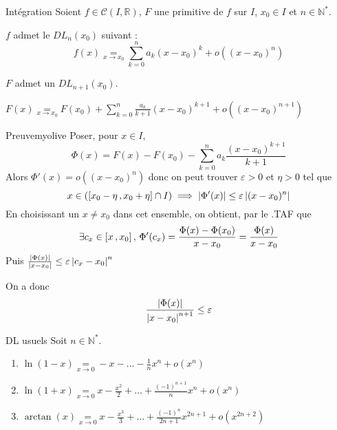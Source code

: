     \begin{prop}{Intégration}{}
        Soient $f \in \mathcal{C}(I,\mathbb{R})$, $F$ une primitive de $f$ sur $I$, $x_0 \in I$ et $n \in \mathbb{N}^*$.

        \begin{suppose}
            \item $f$ admet le $DL_n(x_0)$ suivant : \[ f(x) \underset{x \rightarrow x_0}{=} \sum\limits_{k=0}^n a_k (x - x_0)^k + o\left((x-x_0)^n\right) \]
        \end{suppose}
        \tcblower
        \begin{alors}
            \item $F$ admet un $DL_{n+1}(x_0)$.
            \item $F(x) \underset{x \rightarrow x_0}{=} F(x_0) + \sum\limits_{k=0}^n \frac{a_k}{k+1} (x - x_0)^{k+1} + o\left((x-x_0)^{n+1}\right)$
        \end{alors}
    \end{prop}

    \begin{demo}{Preuve}{myolive}
        Poser, pour $x \in I$, 
        \[ \Phi (x) = F(x)-F(x_0)-\sum\limits_{k=0}^n a_k \frac{(x-x_0)^{k+1}}{k+1} \]
        Alors $\Phi'(x) = o((x-x_0)^n)$ donc on peut trouver $\varepsilon > 0$ et $\eta > 0$ tel que \[ x \in (\left[ x_0-\eta \, , x_0+\eta \right]\cap I) \implies \left\lvert \Phi'(x)\right\rvert \leq \varepsilon \left\lvert (x-x_0)^n\right\rvert \]
        En choisissant un $x \neq x_0$ dans cet ensemble, on obtient, par le .TAF que \[ \exists c_x \in \left[ x \, , x_0 \right], \, \Phi'(c_x) = \frac{\Phi(x) - \Phi(x_0)}{x-x_0} = \frac{\Phi(x)}{x-x_0} \]
        Puis $\frac{\left\lvert \Phi(x)\right\rvert}{\left\lvert x-x_0\right\rvert} \leq \varepsilon \left\lvert c_x - x_0\right\rvert^n$ 
        
        On a donc \[ \frac{\left\lvert \Phi(x)\right\rvert}{\left\lvert x-x_0\right\rvert^{n+1}} \leq \varepsilon \]
    \end{demo}

    \begin{coro}{DL usuels}{}
        Soit $n \in \mathbb{N}^*$.
        \begin{enumerate}
            \item $\ln(1-x) \underset{x \rightarrow 0}{=} -x - \ldots - \frac{1}{n}x^n + o(x^n)$
            \item $\ln(1+x) \underset{x \rightarrow 0}{=} x - \frac{x^2}{2} + \ldots + \frac{(-1)^{n+1}}{n}x^n + o(x^n)$
            \item $\arctan(x) \underset{x \rightarrow 0}{=} x - \frac{x^3}{3} + \ldots + \frac{(-1)^n}{2n+1}x^{2n+1} + o(x^{2n+2})$
        \end{enumerate}
    \end{coro}

